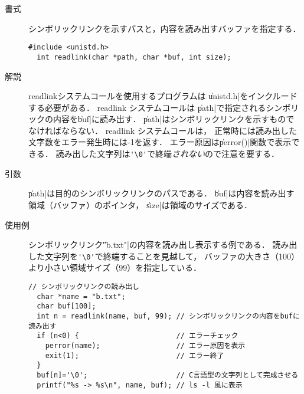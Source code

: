 \begin{description}
\item[書式] シンボリックリンクを示すパスと，内容を読み出すバッファを指定する．
\begin{lstlisting}[numbers=none]
  #include <unistd.h>
  int readlink(char *path, char *buf, int size);
\end{lstlisting}

\item[解説] readlinkシステムコールを使用するプログラムは
\|unistd.h|をインクルードする必要がある．
readlink システムコールは
\|path|で指定されるシンボリックの内容を\|buf|に読み出す．
\|path|はシンボリックリンクを示すものでなければならない．
readlink システムコールは，
正常時には読み出した文字数をエラー発生時には-1を返す．
エラー原因は\|perror()|関数で表示できる．
読み出した文字列は\verb;'\0';で終端\emph{されない}ので注意を要する．

\item[引数] \|path|は目的のシンボリックリンクのパスである．
\|buf|は内容を読み出す領域（バッファ）のポインタ，
\|size|は領域のサイズである．

\item[使用例] シンボリックリンク\|"b.txt"|の内容を読み出し表示する例である．
読み出した文字列を\verb;'\0';で終端することを見越して，
バッファの大きさ（100）より小さい領域サイズ（99）を指定している．
\begin{lstlisting}[numbers=none]
  // シンボリックリンクの読み出し
  char *name = "b.txt";
  char buf[100];
  int n = readlink(name, buf, 99); // シンボリックリンクの内容をbufに読み出す
  if (n<0) {                       // エラーチェック
    perror(name);                  // エラー原因を表示
    exit(1);                       // エラー終了
  }
  buf[n]='\0';                     // C言語型の文字列として完成させる
  printf("%s -> %s\n", name, buf); // ls -l 風に表示
\end{lstlisting}
\end{description}


